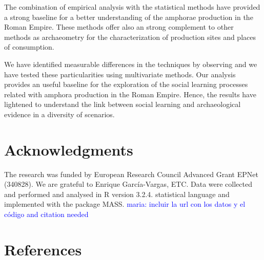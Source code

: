 \documentclass[review]{elsarticle}
\newcommand{\memo}[2]{\textcolor{#1}{#2}}
\newcommand{\maria}[1]{\memo{blue}{maria: #1\\}}
\begin{document}
The combination of empirical analysis with the statistical methods have provided a strong baseline for a better understanding of the amphorae production in the Roman Empire. These methods offer also an strong complement to other methods as archaeometry for the characterization of production sites and places of consumption.  

We have identified measurable differences in the techniques by observing and we have tested these particularities using multivariate methods. Our analysis provides an useful baseline for the exploration of the social learning processes related with amphora production in the Roman Empire. Hence, the results have lightened to understand the link between social learning and archaeological evidence in a diversity of scenarios. 

\section{Acknowledgments}

The research was funded by European Research Council Advanced Grant EPNet (340828).
We are grateful to Enrique Garc\'ia-Vargas, ETC.  Data were collected and performed and analysed in R version 3.2.4. statistical language and implemented with the package MASS.
\maria{incluir la url con los datos y el código and citation needed}





\section*{References}

%

\end{document}

